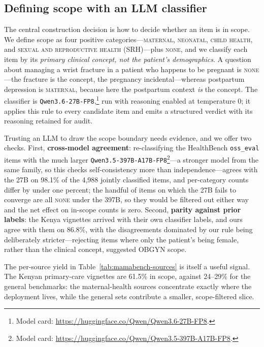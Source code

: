 \subsection{Defining scope with an LLM classifier}
\label{sec:mamabench-scope}

The central construction decision is how to decide whether an item is in scope.
We define scope as four positive categories---\textsc{maternal},
\textsc{neonatal}, \textsc{child health}, and
\textsc{sexual and reproductive health} (SRH)---plus \textsc{none}, and we
classify
each item by its \emph{primary clinical concept, not the patient's
demographics}. A question about managing a wrist fracture in a patient
who happens to be pregnant is \textsc{none}---the fracture is the concept, the
pregnancy incidental---whereas postpartum depression is \textsc{maternal},
because here the postpartum context \emph{is} the concept. The classifier is
\texttt{Qwen3.6-27B-FP8},\footnote{Model card:
\url{https://huggingface.co/Qwen/Qwen3.6-27B-FP8}.} run
with reasoning enabled at temperature 0; it applies this rule to every candidate
item and emits a structured verdict with its reasoning retained for audit.

Trusting an LLM to draw the scope boundary needs evidence, and we offer two
checks. First, \textbf{cross-model agreement}: re-classifying the HealthBench
\texttt{oss\_eval} items with the much larger
\texttt{Qwen3.5-397B-A17B-FP8}\footnote{Model card:
\url{https://huggingface.co/Qwen/Qwen3.5-397B-A17B-FP8}.}---a stronger model from
the same family, so this checks self-consistency more than
independence---agrees with the 27B on
98.1\% of the 4{,}988 jointly classified items, and per-category counts differ
by under one percent; the handful of items on which the 27B fails to converge
are all \textsc{none} under the 397B, so they would be filtered out either way
and the net effect on in-scope counts is zero. Second, \textbf{parity against
prior labels}: the Kenya vignettes arrived with their own classifier labels,
and ours agree with them on 86.8\%, with the disagreements dominated by our rule
being deliberately stricter---rejecting items where only the patient's being
female, rather than the clinical concept, suggested OBGYN scope.

The per-source yield in Table~\ref{tab:mamabench-sources} is itself a useful
signal. The Kenyan primary-care vignettes are 61.5\% in scope, against
24--29\% for the general benchmarks: the maternal-health sources
concentrate exactly where the deployment lives, while the general sets
contribute a smaller, scope-filtered slice.

